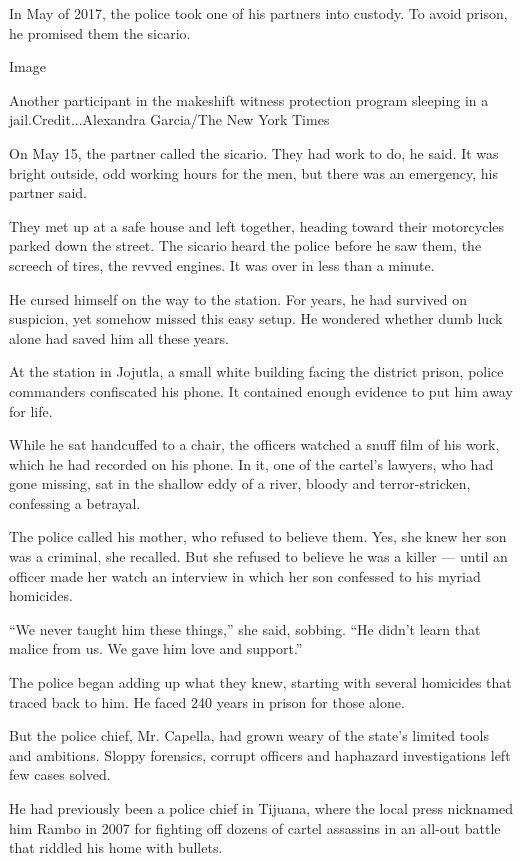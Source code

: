In May of 2017, the police took one of his partners into custody. To
avoid prison, he promised them the sicario.

Image

Another participant in the makeshift witness protection program sleeping
in a jail.Credit...Alexandra Garcia/The New York Times

On May 15, the partner called the sicario. They had work to do, he said.
It was bright outside, odd working hours for the men, but there was an
emergency, his partner said.

They met up at a safe house and left together, heading toward their
motorcycles parked down the street. The sicario heard the police before
he saw them, the screech of tires, the revved engines. It was over in
less than a minute.

He cursed himself on the way to the station. For years, he had survived
on suspicion, yet somehow missed this easy setup. He wondered whether
dumb luck alone had saved him all these years.

At the station in Jojutla, a small white building facing the district
prison, police commanders confiscated his phone. It contained enough
evidence to put him away for life.

While he sat handcuffed to a chair, the officers watched a snuff film of
his work, which he had recorded on his phone. In it, one of the cartel's
lawyers, who had gone missing, sat in the shallow eddy of a river,
bloody and terror-stricken, confessing a betrayal.

The police called his mother, who refused to believe them. Yes, she knew
her son was a criminal, she recalled. But she refused to believe he was
a killer --- until an officer made her watch an interview in which her
son confessed to his myriad homicides.

``We never taught him these things,'' she said, sobbing. ``He didn't
learn that malice from us. We gave him love and support.''

The police began adding up what they knew, starting with several
homicides that traced back to him. He faced 240 years in prison for
those alone.

But the police chief, Mr. Capella, had grown weary of the state's
limited tools and ambitions. Sloppy forensics, corrupt officers and
haphazard investigations left few cases solved.

He had previously been a police chief in Tijuana, where the local press
nicknamed him Rambo in 2007 for fighting off dozens of cartel assassins
in an all-out battle that riddled his home with bullets.

